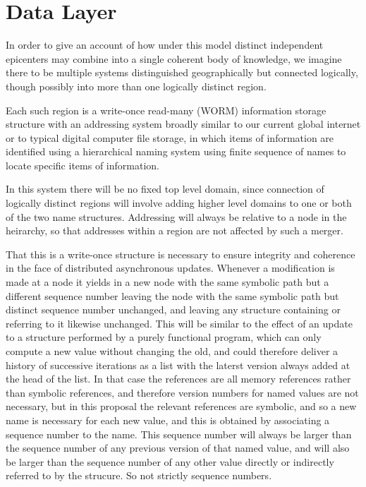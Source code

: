 \documentclass[10pt,titlepage]{article}
\begin{document}
\section{Data Layer}

In order to give an account of how under this model distinct independent epicenters may combine into a single coherent body of knowledge, we imagine there to be multiple systems distinguished geographically but connected logically, though possibly into more than one logically distinct region.

Each such region is a write-once read-many (WORM) information storage structure with an addressing system broadly similar to our current global internet or to typical digital computer file storage, in which items of information are identified using a hierarchical naming system using finite sequence of names to locate specific items of information.

In this system there will be no fixed top level domain, since connection of logically distinct regions will involve adding higher level domains to one or both of the two name structures.
Addressing will always be relative to a node in the heirarchy, so that addresses within a region are not affected by such a merger.

That this is a write-once structure is necessary to ensure integrity and coherence in the face of distributed asynchronous updates.
Whenever a modification is made at a node it yields in a new node with the same symbolic path but a different sequence number leaving the node with the same symbolic path but distinct sequence number unchanged, and leaving any structure containing or referring to it likewise unchanged.
This will be similar to the effect of an update to a structure performed by a purely functional program, which can only compute a new value without changing the old, and could therefore deliver a history of successive iterations as a list with the laterst version always added at the head of the list.
In that case the references are all memory references rather than symbolic references, and therefore version numbers for named values are not necessary, but in this proposal the relevant references are symbolic, and so a new name is necessary for each new value, and this is obtained by associating a sequence number to the name.
This sequence number will always be larger than the sequence number of any previous version of that named value, and will also be larger than the sequence number of any other value directly or indirectly referred to by the strucure.
So not strictly sequence numbers.
\end{document}
